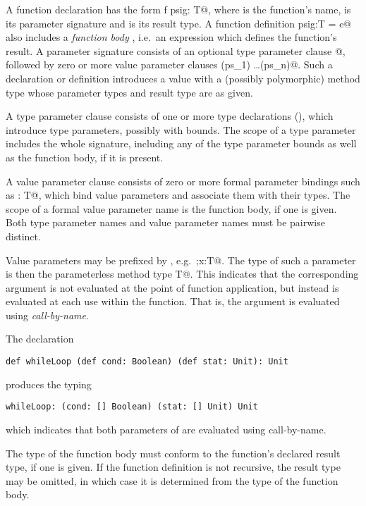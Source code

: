 \documentclass[11pt]{report}
\begin{document}
A function declaration has the form \verb@def f psig: T@, where
\verb@f@ is the function's name, \verb@psig@ is its parameter
signature and \verb@T@ is its result type. A function definition
\verb@f psig:T = e@ also includes a {\em function body} \verb@e@,
i.e.\ an expression which defines the function's result.  A parameter
signature consists of an optional type parameter clause \verb@[tps]@,
followed by zero or more value parameter clauses
\verb@(ps_1) \ldots (ps_n)@.  Such a declaration or definition
introduces a value with a (possibly polymorphic) method type whose
parameter types and result type are as given.

A type parameter clause \verb@tps@ consists of one or more type
declarations (), which introduce type parameters,
possibly with bounds.  The scope of a type parameter \verb@a@ includes
the whole signature, including any of the type parameter bounds as
well as the function body, if it is present.  

A value parameter clause \verb@ps@ consists of zero or more formal
parameter bindings such as \verb@x: T@, which bind value
parameters and associate them with their types.  The scope of a formal
value parameter name \verb@x@ is the function body, if one is
given. Both type parameter names and value parameter names must be
pairwise distinct.

Value parameters may be prefixed by \verb@def@, e.g.\
\verb@\DEF;x:T@. The type of such a parameter is then the
parameterless method type \verb@[]T@. This indicates that the
corresponding argument is not evaluated at the point of function
application, but instead is evaluated at each use within the
function. That is, the argument is evaluated using {\em call-by-name}.

\example The declaration
\begin{verbatim}
def whileLoop (def cond: Boolean) (def stat: Unit): Unit
\end{verbatim}
produces the typing
\begin{verbatim}
whileLoop: (cond: [] Boolean) (stat: [] Unit) Unit
\end{verbatim}
which indicates that both parameters of \verb@while@ are evaluated using
call-by-name.

The type of the function body must conform to the function's declared
result type, if one is given. If the function definition is not
recursive, the result type may be omitted, in which case it is
determined from the type of the function body.
\end{document}
